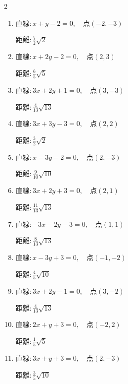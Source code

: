 \begin{multicols}{2}
\begin{enumerate}
        $\displaystyle 距離 : \sqrt{2}$

\columnbreak %

\resetques

  \item $直線:x+y-2=0,\quad 点 ( -2, -3 )$

        $\displaystyle 距離 : \frac{7}{2}\sqrt{2}$

  \item $直線:x+2y-2=0,\quad 点 ( 2, 3 )$

        $\displaystyle 距離 : \frac{6}{5}\sqrt{5}$

  \item $直線:3x+2y+1=0,\quad 点 ( 3, -3 )$

        $\displaystyle 距離 : \frac{4}{13}\sqrt{13}$

  \item $直線:3x+3y-3=0,\quad 点 ( 2, 2 )$

        $\displaystyle 距離 : \frac{3}{2}\sqrt{2}$

  \item $直線:x-3y-2=0,\quad 点 ( 2, -3 )$

        $\displaystyle 距離 : \frac{9}{10}\sqrt{10}$

  \item $直線:3x+2y+3=0,\quad 点 ( 2, 1 )$

        $\displaystyle 距離 : \frac{11}{13}\sqrt{13}$

  \item $直線:-3x-2y-3=0,\quad 点 ( 1, 1 )$

        $\displaystyle 距離 : \frac{8}{13}\sqrt{13}$

  \item $直線:x-3y+3=0,\quad 点 ( -1, -2 )$

        $\displaystyle 距離 : \frac{4}{5}\sqrt{10}$

  \item $直線:3x+2y-1=0,\quad 点 ( 3, -2 )$

        $\displaystyle 距離 : \frac{4}{13}\sqrt{13}$

  \item $直線:2x+y+3=0,\quad 点 ( -2, 2 )$

        $\displaystyle 距離 : \frac{1}{5}\sqrt{5}$

\columnbreak %

  \item $直線:3x+y+3=0,\quad 点 ( 2, -3 )$

        $\displaystyle 距離 : \frac{3}{5}\sqrt{10}$


\end{enumerate}
\end{multicols}
